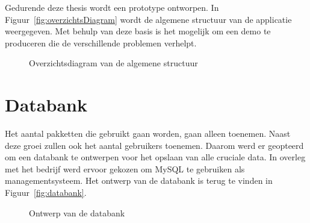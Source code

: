 Gedurende deze thesis wordt een prototype ontworpen.
In Figuur~\vref{fig:overzichtsDiagram} wordt de algemene structuur van de applicatie weergegeven.
Met behulp van deze basis is het mogelijk om een demo te produceren die de verschillende problemen verhelpt.

\begin{figure}[!hbt]
\centering
  
  \caption{Overzichtsdiagram van de algemene structuur}
  \label{fig:overzichtsDiagram}
\end{figure}

\section{Databank}\label{sec:databank}
Het aantal pakketten die gebruikt gaan worden, gaan alleen toenemen.
Naast deze groei zullen ook het aantal gebruikers toenemen.
Daarom werd er geopteerd om een databank te ontwerpen voor het opslaan van alle cruciale data.
In overleg met het bedrijf werd ervoor gekozen om MySQL te gebruiken als managementsysteem.
Het ontwerp van de databank is terug te vinden in Figuur~\vref{fig:databank}.

\begin{figure}[!ht]
\centering
{}
\caption{Ontwerp van de databank}
\label{fig:databank}
\end{figure}

